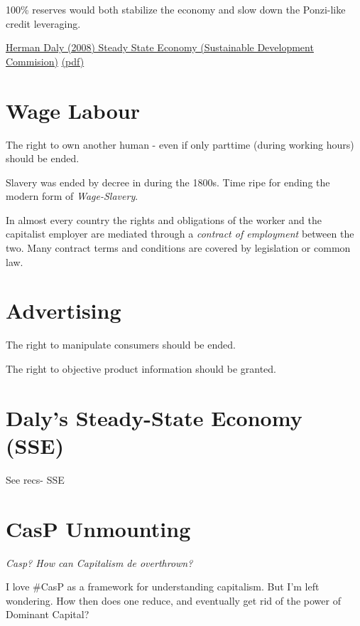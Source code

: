 \documentclass[
]{book}
\begin{document}
100\% reserves would both stabilize the economy and slow down the Ponzi-like
credit leveraging.

\href{http://\%20www.sd-commission.org.uk/publications.php@id=775.html}{Herman Daly (2008) Steady State Economy (Sustainable Development Commision)}
\href{pdf/Daly_2008_Steady_State_Economy_SD_Commision.pdf}{(pdf)}

\hypertarget{wage-labour-1}{%
\section{Wage Labour}\label{wage-labour-1}}

The right to own another human - even if only parttime (during working hours) should be ended.

Slavery was ended by decree in during the 1800s.
Time ripe for ending the modern form of \emph{Wage-Slavery}.

In almost every country the rights and obligations of the worker and the capitalist employer
are mediated through a \emph{contract of employment} between the two.
Many contract terms and conditions are covered by legislation or common law.

\hypertarget{advertising-1}{%
\section{Advertising}\label{advertising-1}}

The right to manipulate consumers should be ended.

The right to objective product information should be granted.

\hypertarget{dalys-steady-state-economy-sse}{%
\section{Daly's Steady-State Economy (SSE)}\label{dalys-steady-state-economy-sse}}

See recs- SSE

\hypertarget{casp-unmounting}{%
\section{CasP Unmounting}\label{casp-unmounting}}

\emph{Casp? How can Capitalism de overthrown?}

I love \#CasP as a framework for understanding capitalism.
But I'm left wondering. How then does one reduce, and eventually get rid of
the power of Dominant Capital?
\end{document}
